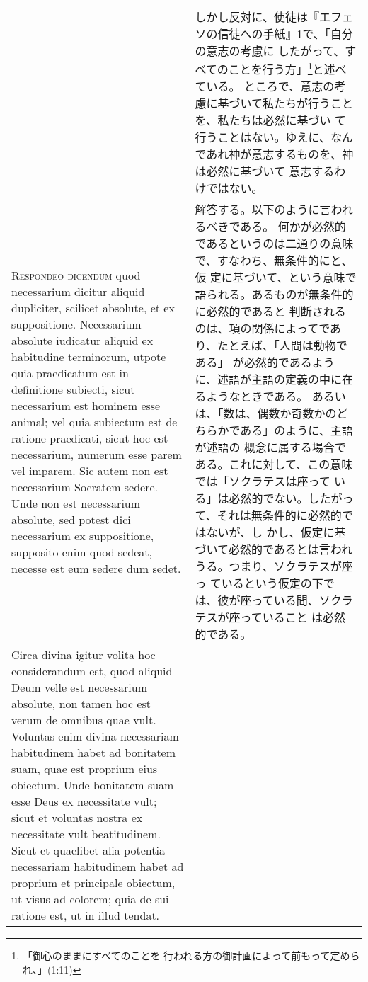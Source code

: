 \documentclass[10pt]{jsarticle} %
\begin{document}
\begin{longtable}{p{21em}p{21em}}
&

しかし反対に、使徒は『エフェソの信徒への手紙』1で、「自分の意志の考慮に
 したがって、すべてのことを行う方」\footnote{「御心のままにすべてのことを
 行われる方の御計画によって前もって定められ、」(1:11)}と述べている。
 ところで、意志の考慮に基づいて私たちが行うことを、私たちは必然に基づい
 て行うことはない。ゆえに、なんであれ神が意志するものを、神は必然に基づいて
 意志するわけではない。
 

\\


{\scshape Respondeo dicendum} quod necessarium dicitur
aliquid dupliciter, scilicet absolute, et ex suppositione. Necessarium
absolute iudicatur aliquid ex habitudine terminorum, utpote quia
praedicatum est in definitione subiecti, sicut necessarium est hominem
esse animal; vel quia subiectum est de ratione praedicati, sicut hoc est
necessarium, numerum esse parem vel imparem. Sic autem non est
necessarium Socratem sedere. Unde non est necessarium absolute, sed
potest dici necessarium ex suppositione, supposito enim quod sedeat,
 necesse est eum sedere dum sedet.


 &

 解答する。以下のように言われるべきである。
 何かが必然的であるというのは二通りの意味で、すなわち、無条件的にと、仮
 定に基づいて、という意味で語られる。あるものが無条件的に必然的であると
 判断されるのは、項の関係によってであり、たとえば、「人間は動物である」
 が必然的であるように、述語が主語の定義の中に在るようなときである。
 あるいは、「数は、偶数か奇数かのどちらかである」のように、主語が述語の
 概念に属する場合である。これに対して、この意味では「ソクラテスは座って
 いる」は必然的でない。したがって、それは無条件的に必然的ではないが、し
 かし、仮定に基づいて必然的であるとは言われうる。つまり、ソクラテスが座っ
 ているという仮定の下では、彼が座っている間、ソクラテスが座っていること
 は必然的である。

 \\
 

 Circa divina igitur volita hoc
considerandum est, quod aliquid Deum velle est necessarium absolute, non
tamen hoc est verum de omnibus quae vult. Voluntas enim divina
necessariam habitudinem habet ad bonitatem suam, quae est proprium eius
obiectum. Unde bonitatem suam esse Deus ex necessitate vult; sicut et
voluntas nostra ex necessitate vult beatitudinem. Sicut et quaelibet
alia potentia necessariam habitudinem habet ad proprium et principale
obiectum, ut visus ad colorem; quia de sui ratione est, ut in illud
 tendat.


\end{longtable}
\end{document}
